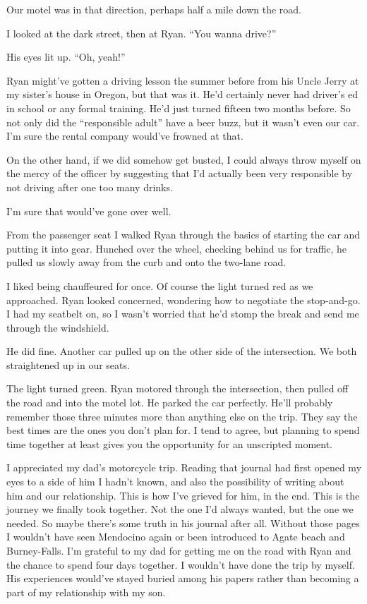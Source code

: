 \documentclass[12pt]{book}
\begin{document}
Our motel was in that direction, perhaps half a mile down the road.

I looked at the dark street, then at Ryan. ``You wanna drive?''

His eyes lit up. ``Oh, yeah!''

Ryan might've gotten a driving lesson the summer before from his Uncle Jerry at my sister's house in Oregon, but that was it. He'd certainly never had driver's ed in school or any formal training. He'd just turned fifteen two months before. So not only did the ``responsible adult'' have a beer buzz, but it wasn't even our car. I'm sure the rental company would've frowned at that.

On the other hand, if we did somehow get busted, I could always throw myself on the mercy of the officer by suggesting that I'd actually been very responsible by not driving after one too many drinks.

I'm sure that would've gone over well.

From the passenger seat I walked Ryan through the basics of starting the car and putting it into gear. Hunched over the wheel, checking behind us for traffic, he pulled us slowly away from the curb and onto the two-lane road.

I liked being chauffeured for once. Of course the light turned red as we approached. Ryan looked concerned, wondering how to negotiate the stop-and-go. I had my seatbelt on, so I wasn't worried that he'd stomp the break and send me through the windshield.

He did fine. Another car pulled up on the other side of the intersection. We both straightened up in our seats.

The light turned green. Ryan motored through the intersection, then pulled off the road and into the motel lot. He parked the car perfectly. He'll probably remember those three minutes more than anything else on the trip. They say the best times are the ones you don't plan for. I tend to agree, but planning to spend time together at least gives you the opportunity for an unscripted moment.

I appreciated my dad's motorcycle trip. Reading that journal had first opened my eyes to a side of him I hadn't known, and also the possibility of writing about him and our relationship. This is how I've grieved for him, in the end. This is the journey we finally took together. Not the one I'd always wanted, but the one we needed. So maybe there's some truth in his journal after all. Without those pages I wouldn't have seen Mendocino again or been introduced to Agate beach and Burney-Falls. I'm grateful to my dad for getting me on the road with Ryan and the chance to spend four days together. I wouldn't have done the trip by myself. His experiences would've stayed buried among his papers rather than becoming a part of my relationship with my son.
\end{document}
